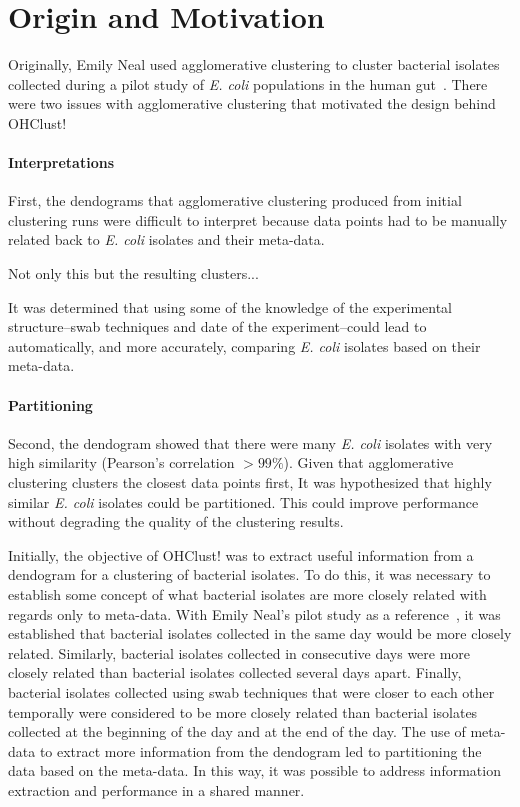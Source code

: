 \documentclass[12pt]{ucthesis}
\begin{document}
   \section{Origin and Motivation}\label{sec:origin}
      Originally, Emily Neal used \textsf{agglomerative clustering} to cluster
      bacterial isolates collected during a pilot study of \textit{E. coli}
      populations in the human gut~\cite{Montana:ChronoCluster}. There were two
      issues with \textsf{agglomerative clustering} that motivated the design
      behind \textsf{OHClust!}

      \paragraph{Interpretations} First, the dendograms that
      \textsf{agglomerative clustering} produced from initial clustering runs
      were difficult to interpret because data points had to be manually
      related back to \textit{E. coli} isolates and their meta-data.

      Not only this but the resulting clusters...

      It was determined
      that using some of the knowledge of the experimental structure--swab
      techniques and date of the experiment--could lead to automatically, and
      more accurately, comparing \textit{E. coli} isolates based on their
      meta-data.


      \paragraph{Partitioning} Second, the dendogram showed that there were
      many \textit{E. coli} isolates with very high similarity (Pearson's
      correlation $> 99\%$). Given that \textsf{agglomerative clustering}
      clusters the closest data points first, It was hypothesized that highly
      similar \textit{E. coli} isolates could be partitioned. This could
      improve performance without degrading the quality of the clustering
      results.

      Initially, the objective of \textsf{OHClust!} was to extract useful
      information from a dendogram for a clustering of bacterial isolates. To
      do this, it was necessary to establish some concept of what bacterial
      isolates are more closely related with regards only to meta-data. With
      Emily Neal's pilot study as a reference~\cite{Montana:ChronoCluster}, it
      was established that bacterial isolates collected in the same day would
      be more closely related. Similarly, bacterial isolates collected in
      consecutive days were more closely related than bacterial isolates
      collected several days apart. Finally, bacterial isolates collected using
      swab techniques that were closer to each other temporally were considered
      to be more closely related than bacterial isolates collected at the
      beginning of the day and at the end of the day. The use of meta-data to
      extract more information from the dendogram led to partitioning the data
      based on the meta-data. In this way, it was possible to address
      information extraction and performance in a shared manner.
\end{document}
